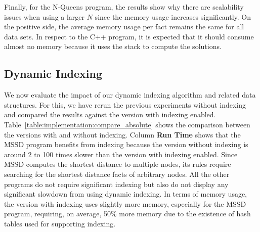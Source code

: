 Finally, for the N-Queens program, the results show why there are scalability
issues when using a larger $N$ since the memory usage increases significantly.
On the positive side, the average memory usage per fact remains the same for all
data sets. In respect to the C++ program, it is expected that it should consume
almost no memory because it uses the stack to compute the solutions.

\subsection{Dynamic Indexing}

We now evaluate the impact of our dynamic indexing algorithm and related data
structures. For this, we have rerun the previous experiments without indexing
and compared the results against the version with indexing enabled.
Table~\ref{table:implementation:compare_absolute} shows the comparison between
the versions with and without indexing.
Column \textbf{Run Time} shows that the MSSD program benefits from
indexing because the version without indexing is around 2 to 100 times slower than
the version with indexing enabled. Since MSSD computes the shortest distance to
multiple nodes, its rules require searching for the shortest distance facts of
arbitrary nodes. All the other programs do not require significant indexing but
also do not display any significant slowdown from using dynamic indexing. In
terms of memory usage, the version with indexing uses slightly more memory,
especially for the MSSD program, requiring, on average, 50\% more memory due to
the existence of hash tables used for supporting indexing.

\begin{table}[ht]
   \begin{center}
      
   \end{center}


   \label{table:implementation:compare_absolute}
\end{table}

